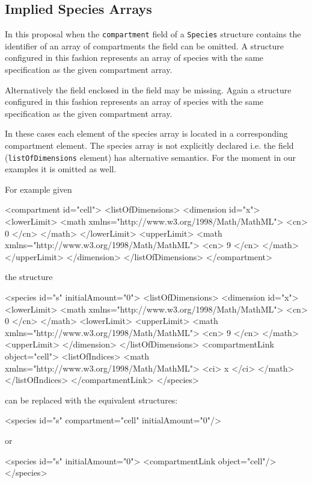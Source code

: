 \documentclass{cekarticle}
\begin{document}
\subsection{Implied Species Arrays}
\label{sec:impliedarrays}

In this proposal when the \texttt{compartment} field of a
\texttt{Species} structure contains the identifier of an array of
compartments the  field can be omitted.
A structure configured in this fashion
represents an array of species with the same specification as the
given compartment array.

Alternatively the  field enclosed in the  field
may be missing.  Again a structure configured in this fashion
represents an array of species with the same specification as the
given compartment array.

In these cases each element of the species array is
located in a corresponding compartment element.  The species array
is not explicitly declared i.e. the  field (\texttt{listOfDimensions} element)
has alternative semantics.  For the moment in our examples it is omitted as well.

For example given
\begin{example}
<compartment id="cell">
    <listOfDimensions>
         <dimension id="x">
             <lowerLimit>
                 <math xmlns="http://www.w3.org/1998/Math/MathML">
                     <cn> 0 </cn>
                 </math>
             </lowerLimit>
             <upperLimit>
                 <math xmlns="http://www.w3.org/1998/Math/MathML">
                     <cn> 9 </cn>
                 </math>
             </upperLimit>
         </dimension>
    </listOfDimensions>
</compartment>
\end{example}
the structure
\begin{example}
<species id="s" initialAmount="0">
    <listOfDimensions>
        <dimension id="x">
            <lowerLimit>
                <math xmlns="http://www.w3.org/1998/Math/MathML">
                    <cn> 0 </cn>
                </math>
            <lowerLimit>
            <upperLimit>
                <math xmlns="http://www.w3.org/1998/Math/MathML">
                    <cn> 9 </cn>
                </math>
            <upperLimit>
        </dimension>
    </listOfDimensions>
    <compartmentLink object="cell">
        <listOfIndices>
            <math xmlns="http://www.w3.org/1998/Math/MathML">
                <ci> x </ci>
            </math>
        </listOfIndices>
    </compartmentLink>
</species>
\end{example}
can be replaced with the equivalent structures:
\begin{example}
<species id="s" compartment="cell" initialAmount="0"/>
\end{example}
or
\begin{example}
<species id="s" initialAmount="0">
    <compartmentLink object="cell"/>
</species>
\end{example}
\end{document}
